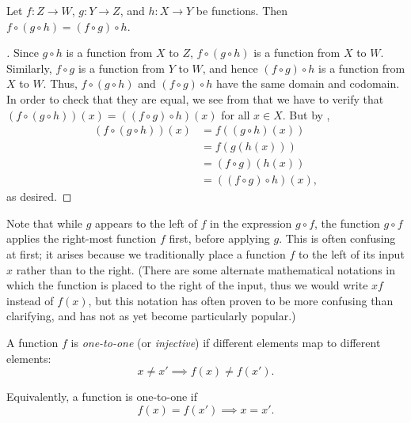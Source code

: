 \setcounter{thm}{11}
\begin{lem}\label{i:3.3.12}
  Let \(f : Z \to W\), \(g : Y \to Z\), and \(h : X \to Y\) be functions.
  Then \(f \circ (g \circ h) = (f \circ g) \circ h\).
\end{lem}

\begin{proof}[]
  Since \(g \circ h\) is a function from \(X\) to \(Z\), \(f \circ (g \circ h)\) is a function from \(X\) to \(W\).
  Similarly, \(f \circ g\) is a function from \(Y\) to \(W\), and hence \((f \circ g) \circ h\) is a function from \(X\) to \(W\).
  Thus, \(f \circ (g \circ h)\) and \((f \circ g) \circ h\) have the same domain and codomain.
  In order to check that they are equal, we see from  that we have to verify that \((f \circ (g \circ h))(x) = ((f \circ g) \circ h)(x)\) for all \(x \in X\).
  But by ,
  \begin{align*}
    (f \circ (g \circ h))(x)
     & = f((g \circ h)(x))         \\
     & = f(g(h(x)))                \\
     & = (f \circ g)(h(x))         \\
     & = ((f \circ g) \circ h)(x),
  \end{align*}
  as desired.
\end{proof}

\begin{rmk}\label{i:3.3.13}
  Note that while \(g\) appears to the left of \(f\) in the expression \(g \circ f\), the function \(g \circ f\) applies the right-most function \(f\) first, before applying \(g\).
  This is often confusing at first;
  it arises because we traditionally place a function \(f\) to the left of its input \(x\) rather than to the right.
  (There are some alternate mathematical notations in which the function is placed to the right of the input, thus we would write \(xf\) instead of \(f(x)\), but this notation has often proven to be more confusing than clarifying, and has not as yet become particularly popular.)
\end{rmk}

\begin{defn}\label{i:3.3.14}
  A function \(f\) is \emph{one-to-one} (or \emph{injective}) if different elements map to different elements:
  \[
    x \neq x' \implies f(x) \neq f(x').
  \]

  Equivalently, a function is one-to-one if
  \[
    f(x) = f(x') \implies x = x'.
  \]
\end{defn}


